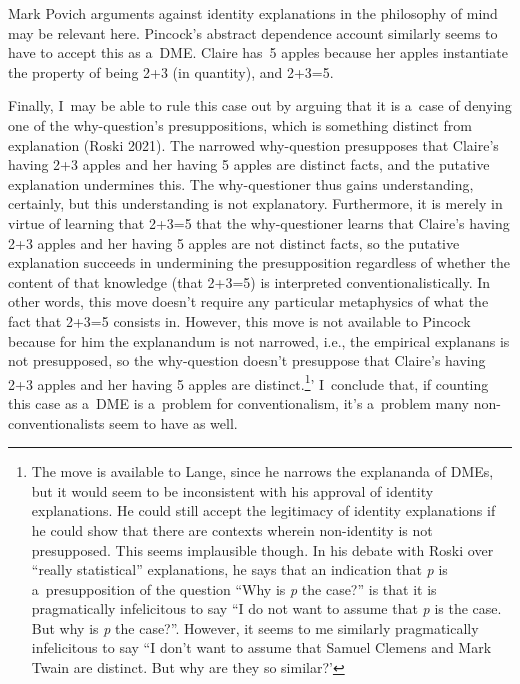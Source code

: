 \begin{artengenv}{Mark Povich}
{%
\parencite*[][pp.104–105]{kim_philosophy_2011} %
 arguments against identity explanations in the philosophy of mind may be relevant here.}
 Pincock's
\parencite*{pincock_abstract_2015}
abstract dependence account similarly seems to have to accept this as a~DME. Claire has~5 apples because her apples instantiate the property of being 2+3 (in quantity), and 2+3=5.

Finally, I~may be able to rule this case out by arguing that it is a~case of denying one of the why-question's presuppositions, which is something distinct from explanation (Roski 2021). The narrowed why-question presupposes that Claire's having 2+3 apples and her having 5 apples are distinct facts, and the putative explanation undermines this. The why-questioner thus gains understanding, certainly, but this understanding is not explanatory. Furthermore, it is merely in virtue of learning that 2+3=5 that the why-questioner learns that Claire's having 2+3 apples and her having 5 apples are not distinct facts, so the putative explanation succeeds in undermining the presupposition regardless of whether the content of that knowledge (that 2+3=5) is interpreted conventionalistically. In other words, this move doesn't require any particular metaphysics of what the fact that 2+3=5 consists in. However, this move is not available to Pincock because for him the explanandum is not narrowed, i.e., the empirical explanans is not presupposed, so the why-question doesn't presuppose that Claire's having 2+3 apples and her having 5 apples are distinct.\footnote{The move is available to Lange, since he narrows the explananda of DMEs, but it would seem to be inconsistent with his approval of identity explanations. He could still accept the legitimacy of identity explanations if he could show that there are contexts wherein non-identity is not presupposed. This seems implausible though. In his
\parencite*[][]{lange_defense_2022} %
 debate with Roski 
\parencite*[][]{roski_defence_2021} %
 over ``really statistical'' explanations, he says that an indication that \textit{p} is a~presupposition of the question ``Why is \textit{p} the case?'' is that it is pragmatically infelicitous to say ``I do not want to assume that \textit{p} is the case. But why is \textit{p} the case?''. However, it seems to me similarly pragmatically infelicitous to say ``I don't want to assume that Samuel Clemens and Mark Twain are distinct. But why are they so similar?'}' I~conclude that, if counting this case as a~DME is a~problem for conventionalism, it's a~problem many non-conventionalists seem to have as well.


\end{artengenv}

